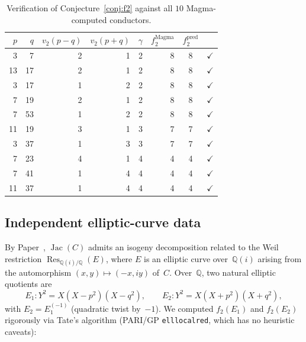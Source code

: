 \documentclass[11pt,a4paper]{article}
\newcommand{\Jac}{\operatorname{Jac}}
\newcommand{\Res}{\operatorname{Res}}
\theoremstyle{definition}
\theoremstyle{remark}
\begin{document}
\begin{table}[H]
\centering
\begin{tabular}{rrrrrrcl}
\toprule
$p$ & $q$ & $v_2(p{-}q)$ & $v_2(p{+}q)$ & $\gamma$
& $f_2^{\mathrm{Magma}}$ & $f_2^{\mathrm{pred}}$ & \\
\midrule
 3 &  7 & 2 & 1 & 2 & 8 & 8 & $\checkmark$ \\
13 & 17 & 2 & 1 & 2 & 8 & 8 & $\checkmark$ \\
 3 & 17 & 1 & 2 & 2 & 8 & 8 & $\checkmark$ \\
 7 & 19 & 2 & 1 & 2 & 8 & 8 & $\checkmark$ \\
 7 & 53 & 1 & 2 & 2 & 8 & 8 & $\checkmark$ \\
11 & 19 & 3 & 1 & 3 & 7 & 7 & $\checkmark$ \\
 3 & 37 & 1 & 3 & 3 & 7 & 7 & $\checkmark$ \\
 7 & 23 & 4 & 1 & 4 & 4 & 4 & $\checkmark$ \\
 7 & 41 & 1 & 4 & 4 & 4 & 4 & $\checkmark$ \\
11 & 37 & 1 & 4 & 4 & 4 & 4 & $\checkmark$ \\
\bottomrule
\end{tabular}
\caption{Verification of Conjecture~\ref{conj:f2}
  against all $10$ Magma-computed conductors.}
\label{tab:verification}
\end{table}

\subsection{Independent elliptic-curve data}
\label{sec:pari}

By Paper~\cite{Chen2026WR}, $\Jac(C)$ admits an isogeny
decomposition related to the Weil restriction
$\Res_{\mathbb{Q}(i)/\mathbb{Q}}(E)$, where $E$ is an
elliptic curve over~$\mathbb{Q}(i)$ arising from the
automorphism $(x,y)\mapsto(-x,iy)$ of~$C$.
Over~$\mathbb{Q}$, two natural elliptic quotients are
\begin{equation}\label{eq:E1E2}
  E_1\colon Y^2 = X(X - p^2)(X - q^2),\qquad
  E_2\colon Y^2 = X(X + p^2)(X + q^2),
\end{equation}
with $E_2 = E_1^{(-1)}$ (quadratic twist by~$-1$).
We computed $f_2(E_1)$ and $f_2(E_2)$ rigorously
via Tate's algorithm (PARI/GP \texttt{elllocalred},
which has no heuristic caveats):
\end{document}
